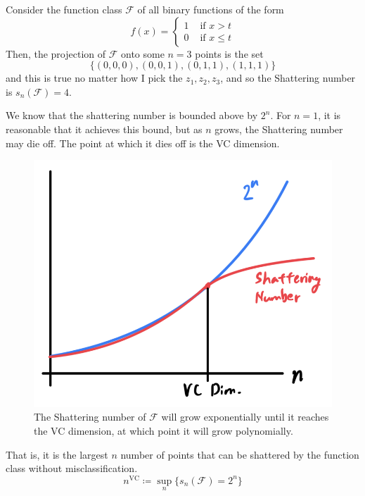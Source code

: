 \documentclass{article}
\begin{document}
    \begin{example}
      Consider the function class $\mathcal{F}$ of all binary functions of the form 
      \begin{equation}
        f(x) = \begin{cases} 1 & \text{ if } x > t \\
          0 & \text{ if } x \leq t \end{cases} 
      \end{equation}
      Then, the projection of $\mathcal{F}$ onto some $n = 3$ points is the set 
      \begin{equation}
        \{ (0, 0, 0), (0, 0, 1), (0, 1, 1), (1, 1, 1) \}
      \end{equation}
      and this is true no matter how I pick the $z_1, z_2, z_3$, and so the Shattering number is $s_n (\mathcal{F}) = 4$. 
    \end{example}

    \begin{definition}[VC Dimension]
      We know that the shattering number is bounded above by $2^n$. For $n = 1$, it is reasonable that it achieves this bound, but as $n$ grows, the Shattering number may die off. The point at which it dies off is the VC dimension. 
      \begin{figure}[H]
        \centering 
        \includegraphics[scale=0.4]{img/Sawyer_lemma.png}
        \caption{The Shattering number of $\mathcal{F}$ will grow exponentially until it reaches the VC dimension, at which point it will grow polynomially.} 
        \label{fig:sawyer_lemma}
      \end{figure}
      That is, it is the largest $n$ number of points that can be shattered by the function class without misclassification. 
      \begin{equation}
        n^{\mathrm{VC}} \coloneqq \sup_n \{ s_n (\mathcal{F}) = 2^n \}
      \end{equation}
    \end{definition}
\end{document}
